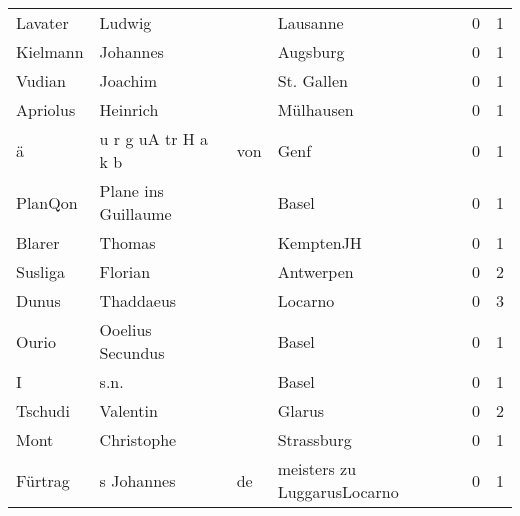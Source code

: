 \begin{tabular}{llllrr}
                  Lavater &                             Ludwig &             &                                    Lausanne &          0 &         1 \\
                 Kielmann &                           Johannes &             &                                    Augsburg &          0 &         1 \\
                   Vudian &                            Joachim &             &                                  St. Gallen &          0 &         1 \\
                 Apriolus &                           Heinrich &             &                                   Mülhausen &          0 &         1 \\
                        ä &                u r g uA tr H a k b &         von &                                        Genf &          0 &         1 \\
                  PlanQon &                Plane ins Guillaume &             &                                       Basel &          0 &         1 \\
                   Blarer &                             Thomas &             &                                   KemptenJH &          0 &         1 \\
                  Susliga &                            Florian &             &                                   Antwerpen &          0 &         2 \\
                    Dunus &                          Thaddaeus &             &                                     Locarno &          0 &         3 \\
                    Ourio &                   Ooelius Secundus &             &                                       Basel &          0 &         1 \\
                        I &                               s.n. &             &                                       Basel &          0 &         1 \\
                  Tschudi &                           Valentin &             &                                      Glarus &          0 &         2 \\
                     Mont &                         Christophe &             &                                  Strassburg &          0 &         1 \\
                  Fürtrag &                         s Johannes &          de &                 meisters zu LuggarusLocarno &          0 &         1 \\

\end{tabular}
